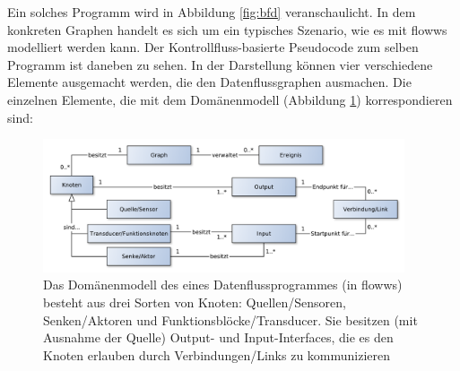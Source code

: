 Ein solches Programm wird in Abbildung \ref{fig:bfd} veranschaulicht. In dem konkreten Graphen handelt es sich um ein typisches Szenario, wie es mit flowws modelliert werden kann. Der Kontrollfluss-basierte Pseudocode zum selben Programm ist daneben zu sehen. In der Darstellung können vier verschiedene Elemente ausgemacht werden, die den Datenflussgraphen ausmachen. Die einzelnen Elemente, die mit dem Domänenmodell (Abbildung \ref{fig:bfddomainmodel}) korrespondieren sind:
\begin{figure}[h]
  \centering
  \includegraphics[width=0.95\textwidth]{bilder/chapter4/chapter4_2/domainmodelldatenfluss2.pdf}
  \caption{Das Domänenmodell des eines Datenflussprogrammes (in flowws) besteht aus drei Sorten von Knoten: Quellen/Sensoren, Senken/Aktoren und Funktionsblöcke/Transducer. Sie besitzen (mit Ausnahme der Quelle) Output- und Input-Interfaces, die es den Knoten erlauben durch Verbindungen/Links zu kommunizieren}
  \label{fig:bfddomainmodel}
\end{figure}
